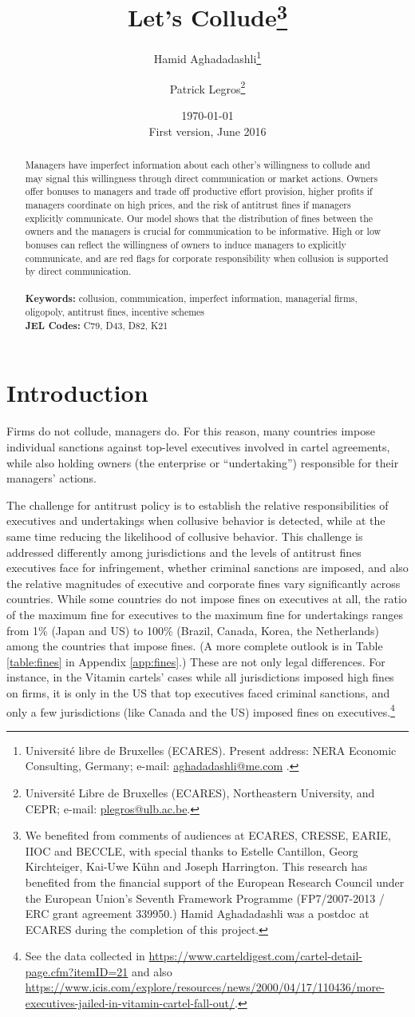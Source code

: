 \documentclass[]{article}
\title{Let's Collude\footnote{We benefited from comments of audiences at ECARES, CRESSE, EARIE, IIOC and BECCLE, with special thanks to Estelle Cantillon, Georg Kirchteiger, Kai-Uwe K\"uhn and Joseph Harrington. This research has benefited from the financial support of the European Research Council under the European Union's Seventh Framework Programme (FP7/2007-2013 / ERC grant agreement 339950.) Hamid Aghadadashli was a postdoc at ECARES during the completion of this project.}}
\author{{\Large Hamid Aghadadashli\thanks{Universit\'e libre de Bruxelles (ECARES). Present address: NERA Economic Consulting, Germany; e-mail: \href{mailto:aghadadashli@me.com}{aghadadashli@me.com}
.}}
\and {\Large Patrick Legros\thanks{Universit\'e Libre de Bruxelles (ECARES), Northeastern University, and CEPR; e-mail:
\href{mailto:plegros@ulb.ac.be}{plegros@ulb.ac.be}.} }}
\date{\today\\First version, June 2016}
\begin{document}
\maketitle
%
\begin{abstract}
	Managers have imperfect information about each other’s willingness to collude and may signal this willingness through direct communication or market actions. Owners offer bonuses to managers and trade off productive effort provision, higher profits if managers coordinate on high prices, and the risk of antitrust fines if managers explicitly communicate.  Our model shows that the distribution of fines between the owners and the managers is crucial for communication to be informative. High or low bonuses can reflect the willingness of owners to induce managers to explicitly communicate, and are red flags for corporate responsibility when collusion is supported by direct communication.\\
	\\
	\noindent \textbf{Keywords:} collusion, communication, imperfect information, managerial firms, oligopoly, antitrust fines,  incentive schemes\\
\noindent \textbf{JEL Codes:} C79, D43, D82, K21
\end{abstract}
\newpage
\onehalfspace
\section{Introduction}
Firms do not collude, managers do. For this reason, many countries impose individual sanctions against top-level executives involved in cartel agreements, while also holding owners (the enterprise or “undertaking”) responsible for their managers’ actions. 

The challenge for antitrust policy is to establish the relative responsibilities of executives and undertakings when collusive behavior is detected, while at the same time reducing the likelihood of collusive behavior. This challenge is addressed differently among jurisdictions and the levels of antitrust fines executives face for infringement, whether criminal sanctions are imposed, and also the relative magnitudes of executive and corporate fines vary significantly across countries. While some countries do not impose fines on executives at all, the ratio of the maximum fine for executives to the maximum fine for undertakings ranges from 1\% (Japan and US) to 100\% (Brazil, Canada, Korea, the Netherlands) among the countries that impose fines. (A more complete outlook is in Table \ref{table:fines} in Appendix \ref{app:fines}.) These are not only legal differences. For instance, in the Vitamin cartels' cases while all jurisdictions imposed high fines on firms, it is only in the US that top executives faced criminal sanctions, and only a few jurisdictions (like Canada and the US) imposed fines on executives.\footnote{See the data collected in \url{https://www.carteldigest.com/cartel-detail-page.cfm?itemID=21} and also \url{https://www.icis.com/explore/resources/news/2000/04/17/110436/more-executives-jailed-in-vitamin-cartel-fall-out/}.} 
\end{document}
